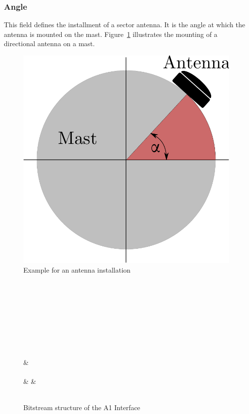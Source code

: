 \documentclass[master,english]{hgbthesis}
\begin{document}
\subsubsection{Angle}
This field defines the installment of a sector antenna. It is the angle at which the antenna is mounted on the mast. Figure~\ref{fig:antennaangle} illustrates the mounting of a directional antenna on a mast.
%
\begin{figure}
	\centering
	\includegraphics[width=0.4\linewidth]{./images/antennaangle}
	\caption{Example for an antenna installation}
	\label{fig:antennaangle}
\end{figure}
\begin{figure}
	\begin{bytefield}[bitwidth=1.1em]{32}
		 \\
		 \\
		\skippedwords\\
		\\
		 \\
		 \\
		 \\
		 \\
		&\\
		\\
		& &  \\
		\\
	\end{bytefield}
	\caption{Bitstream structure of the A1 Interface}
	\label{fig:a1structure}
\end{figure}
\end{document}
